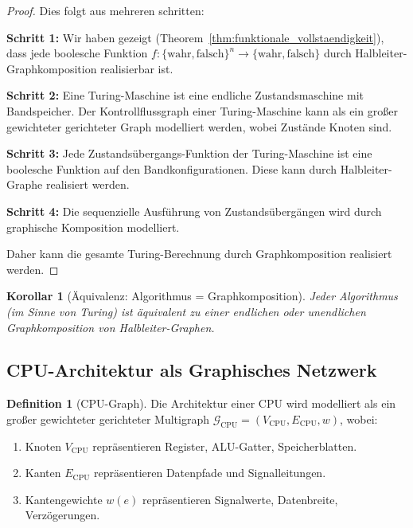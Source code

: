\documentclass[12pt, a4paper]{article}
\newtheorem{corollary}[theorem]{Korollar}
\theoremstyle{definition}
\newtheorem{definition}[theorem]{Definition}
\theoremstyle{remark}
\newcommand{\Bool}{\{\mathrm{wahr}, \mathrm{falsch}\}}
\newcommand{\Graph}{\mathcal{G}}
\begin{document}
\begin{proof}
Dies folgt aus mehreren schritten:

\textbf{Schritt 1:} Wir haben gezeigt (Theorem~\ref{thm:funktionale_vollstaendigkeit}), dass jede boolesche Funktion $f: \Bool^n \to \Bool$ durch Halbleiter-Graphkomposition realisierbar ist.

\textbf{Schritt 2:} Eine Turing-Maschine ist eine endliche Zustandsmaschine mit Bandspeicher. Der Kontrollflussgraph einer Turing-Maschine kann als ein großer gewichteter gerichteter Graph modelliert werden, wobei Zustände Knoten sind.

\textbf{Schritt 3:} Jede Zustandsübergangs-Funktion der Turing-Maschine ist eine boolesche Funktion auf den Bandkonfigurationen. Diese kann durch Halbleiter-Graphe realisiert werden.

\textbf{Schritt 4:} Die sequenzielle Ausführung von Zustandsübergängen wird durch graphische Komposition modelliert.

Daher kann die gesamte Turing-Berechnung durch Graphkomposition realisiert werden.
\end{proof}

\begin{corollary}[Äquivalenz: Algorithmus = Graphkomposition]
Jeder Algorithmus (im Sinne von Turing) ist äquivalent zu einer endlichen oder unendlichen Graphkomposition von Halbleiter-Graphen.
\end{corollary}

\subsection{CPU-Architektur als Graphisches Netzwerk}
\label{subsec:cpu_graphik}

\begin{definition}[CPU-Graph]
\label{def:cpu_graph}
Die Architektur einer CPU wird modelliert als ein großer gewichteter gerichteter Multigraph $\Graph_{\mathrm{CPU}} = (V_{\mathrm{CPU}}, E_{\mathrm{CPU}}, w)$, wobei:
\begin{enumerate}[label=(\alph*)]
  \item Knoten $V_{\mathrm{CPU}}$ repräsentieren Register, ALU-Gatter, Speicherblatten.
  \item Kanten $E_{\mathrm{CPU}}$ repräsentieren Datenpfade und Signalleitungen.
  \item Kantengewichte $w(e)$ repräsentieren Signalwerte, Datenbreite, Verzögerungen.
\end{enumerate}
\end{definition}
\end{document}
